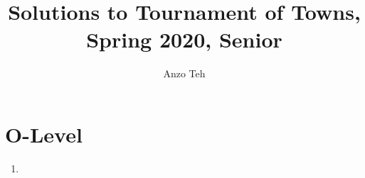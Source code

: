 \documentclass[11pt,a4paper]{article}
\begin{document}
\newcommand{\la}{\leftarrow}
\newcommand{\lra}{\leftrightarrow}
\newcommand{\bbN}{\mathbb{N}}
\newcommand{\bbZ}{\mathbb{Z}}
\newcommand{\dsum}{\displaystyle\sum}
\newcommand{\dprod}{\displaystyle\prod}


\title{Solutions to Tournament of Towns, Spring 2020, Senior}
\author{Anzo Teh}
\date{}
\maketitle

\section*{O-Level}
\begin{enumerate}
	\item
\end{enumerate}
\end{document}
